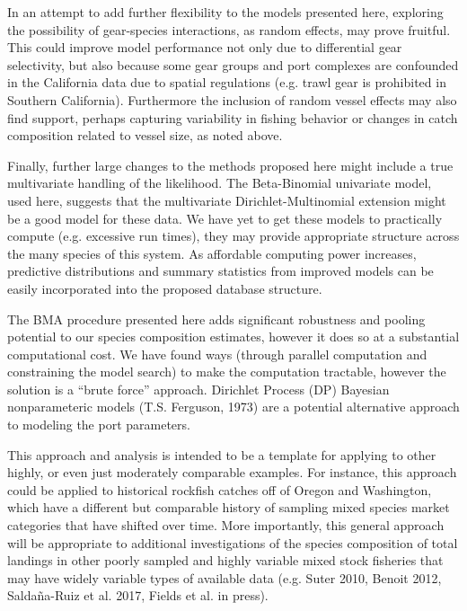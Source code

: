 \documentclass[12pt]{article}
\begin{document}
In an attempt to add further flexibility to the models presented here,
exploring the possibility of gear-species interactions, as random
effects, may prove fruitful. This could improve model performance not only due 
to differential gear selectivity, but also because some gear groups and port 
complexes are confounded in the California data due to spatial regulations 
(e.g. trawl gear is prohibited in Southern California). Furthermore the 
inclusion of random vessel effects may also find support, perhaps capturing 
variability in fishing behavior or changes in catch composition related to 
vessel size, as noted above.

Finally, further large changes to the methods proposed here might include a 
true multivariate handling of the likelihood. The Beta-Binomial univariate 
model, used here, suggests that the multivariate Dirichlet-Multinomial 
extension might be a good model for these data. We have yet to get these 
models to practically compute (e.g. excessive run times), they may provide 
appropriate structure across the many species of this system. As affordable 
computing power increases, predictive distributions and summary statistics 
from improved models can be easily incorporated into the proposed database 
structure.

The BMA procedure presented here adds significant robustness and pooling
potential to our species composition estimates, however it does so at a
substantial computational cost. We have found ways (through parallel
computation and constraining the model search) to make the computation
tractable, however the solution is a ``brute force'' approach. Dirichlet
Process (DP) Bayesian nonparameteric models (T.S. Ferguson, 1973) are a 
potential alternative approach to modeling the port parameters.

This approach and analysis is intended to be a template for applying to other 
highly, or even just moderately comparable examples. For instance, this 
approach could be applied to historical rockfish catches off of Oregon and 
Washington, which have a different but comparable history of sampling mixed 
species market categories that have shifted over time. More importantly, this 
general approach will be appropriate to additional investigations of the 
species composition of total landings in other poorly sampled and highly 
variable mixed stock fisheries that may have widely variable types of 
available data (e.g. Suter 2010, Benoit 2012, Saldaña-Ruiz et al. 2017,  
Fields et al. in press).
\end{document}
